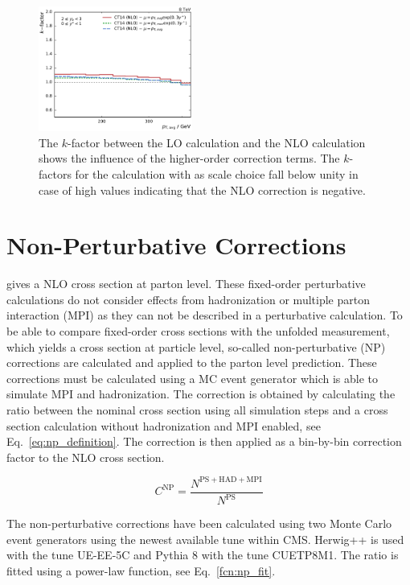 \begin{figure}[htp]
    \includegraphics[width=0.45\textwidth]{figures/theory/kfactor_comp_yb2ys0.pdf}
    \caption{The $k$-factor between the LO calculation and the NLO calculation
    shows the influence of the higher-order correction terms. The $k$-factors
for the calculation with \ptavg as scale choice fall below unity in case of high
\ystar values indicating that the NLO correction is negative.}
    \label{fig:kfactor_comp}
\end{figure}


\section{Non-Perturbative Corrections}

\NLOJETPP gives a NLO cross section at parton level. These fixed-order
perturbative calculations do not consider effects from hadronization or multiple
parton interaction (MPI) as they can not be described in a perturbative
calculation. To be able to
compare fixed-order cross sections with the unfolded measurement, which yields a
cross section at particle level, so-called non-perturbative (NP) corrections are
calculated and applied to the parton level prediction. These corrections must be
calculated using a MC event generator which is able to simulate MPI and
hadronization. The correction is obtained by calculating the ratio between the
nominal cross section using all simulation steps and a cross section calculation
without hadronization and MPI enabled, see Eq.~\ref{eq:np_definition}. The
correction is then applied as a bin-by-bin correction factor to the NLO cross
section.

\begin{equation}
    C^{\mathrm{NP}} = \frac{N^{\mathrm{PS+HAD+MPI}}}{N^{\mathrm{PS}}}
    \label{eq:np_definition}
\end{equation}

The non-perturbative corrections have been calculated using two Monte Carlo
event generators using the newest available tune within CMS. Herwig++ is used
with the tune UE-EE-5C and Pythia 8 with the tune CUETP8M1. The ratio is fitted
using a power-law function, see Eq.~\ref{fcn:np_fit}.

